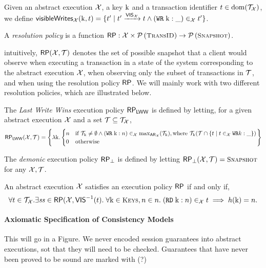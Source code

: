 Given an abstract execution $\mathcal{X}$, a key $\mathrm{k}$ and a transaction identifier $t \in \operatorname{dom}(\mathcal{T}_{\mathcal{X}})$, we 
define $\mathsf{visibleWrites}_{{\mathcal{X}}}(\mathrm{k}, t) = \{ t' \mid t' \xrightarrow{{\mathsf{VIS}}_{{\mathcal{X}}}} t \wedge ({{\tt WR}}\;\mathrm{k}:\_) 
\in_{\mathcal{X}} t' \}$.

\begin{definition}
A \emph{resolution policy} \RP is a function $\RP: \aexec \times \powerset{\TxID} \rightarrow \powerset{\Snapshots}$. 
\end{definition}

intuitively, $\mathsf{RP}(\mathcal{X}, \mathcal{T})$ denotes the set of possible snapshot that a client would observe when executing a transaction 
in a state of the system corresponding to the abstract execution $\mathcal{X}$, when observing only the subset 
of transactions in $\mathcal{T}$, and when using the resolution policy $\mathsf{RP}$. We will mainly work with two different 
resolution policies, which are illustrated below. 

\begin{example}
The \emph{Last Write Wins} execution policy $\mathsf{RP}_{\mathsf{LWW}}$ is defined by letting, for a given abstract execution 
$\mathcal{X}$ and a set $\mathcal{T} \subseteq \mathcal{T}_{\mathcal{X}}$, 
\[
\mathsf{RP}_{\mathsf{LWW}}(\mathcal{X}, \mathcal{T}) = \left \{ \lambda \mathrm{k}.
\begin{cases}
n & \text{if } \mathcal{T}_{\mathrm{k}} \neq \emptyset \wedge ({{\tt WR}}\; \mathrm{k}: n) \in_{\mathcal{X}} \max_{{\sf{AR}}_{\mathcal{X}}}(\mathcal{T}_{\mathrm{k}}), \text{where } 
\mathcal{T}_{\mathrm{k}} (\mathcal{T} \cap \{t \mid t \in_{\mathcal{X}} {{\tt WR}} k: \_ \})\\
0 & \text{otherwise} 
\end{cases}
\right\}
\]

The \emph{demonic} execution policy $\mathsf{RP}_{\bot}$ is defined by letting $\RP_{\bot}(\aexec, \T) = \Snapshots$ for any $\mathcal{X}, \mathcal{T}$.
\end{example}

\begin{definition}
An abstract execution $\mathcal{X}$ satisfies an execution policy $\mathsf{RP}$ if and only if, 
\[
\forall \tsid \in \T_{\aexec}. \exists \h \in \RP(\aexec, \VIS^{-1}(\tsid).\;
\forall \key{k} \in \Addr, n \in \nat.\; (\RD\;\key{k}: n) \in_{\aexec} \tsid \implies 
h(\key{k}) = n.
\]
\end{definition}

\paragraph{Axiomatic Specification of Consistency Models}
\ac{This will go in a Figure. We never encoded session guarantees into abstract 
executions, sot that they will need to be checked. Guarantees that have never been 
proved to be sound are marked with (?)}

